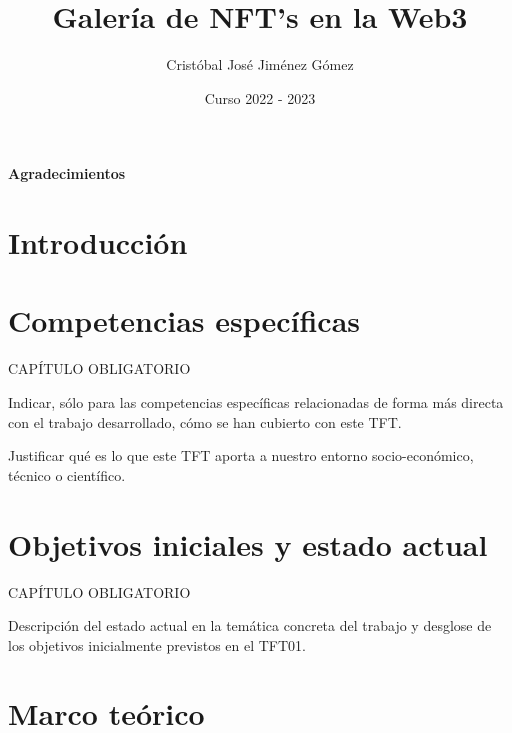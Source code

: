 \documentclass[oneside,12pt]{book}
\title{Galería de NFT's en la Web3}
\author{Cristóbal José Jiménez Gómez}
\date{Curso 2022 - 2023}
\begin{document}


%

\newpage
{}
{\Large{\textbf{Agradecimientos}}}


\clearpage

\tableofcontents

\clearpage
{}

\chapter{Introducción}


\chapter{Competencias específicas}
%
CAPÍTULO OBLIGATORIO

Indicar, sólo para las competencias específicas relacionadas de forma más directa con el trabajo desarrollado, cómo se han cubierto con este TFT.

Justificar qué es lo que este TFT aporta a nuestro entorno socio-económico, técnico o científico.


\chapter{Objetivos iniciales y estado actual}

CAPÍTULO OBLIGATORIO

Descripción del estado actual en la temática concreta del trabajo y desglose de los objetivos inicialmente previstos en el TFT01.

\begin{comment}
        CAPÍTULO OBLIGATORIO
        Metodología aplicada y desarrollo del trabajo en sus distintas fases, decisiones de diseño, herramientas empleadas.
        Si el trabajo incluye software desarrollado, deberán seleccionarse las secciones más relevantes del mismo y comentarlas en la memoria.
        Ajuste a la planificación inicialmente prevista.
        Modificación en los objetivos planteados.
\end{comment}
\chapter{Marco teórico}
\end{document}
